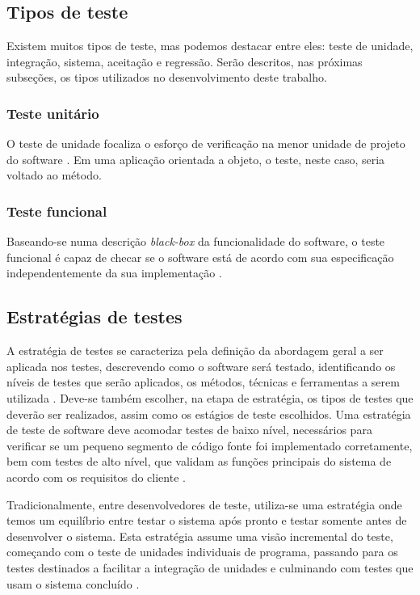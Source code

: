 \documentclass[tg]{mdtufsm}
\begin{document}
\subsection{Tipos de teste}
Existem muitos tipos de teste, mas podemos destacar entre eles: teste de unidade, integração, sistema, aceitação e regressão. Serão descritos, nas próximas subseções, os tipos utilizados no desenvolvimento deste trabalho.

\subsubsection{Teste unitário}
O teste de unidade focaliza o esforço de verificação na menor unidade de projeto do software \cite{pressman2011engenharia}. Em uma aplicação orientada a objeto, o teste, neste caso, seria voltado ao método.

\subsubsection{Teste funcional}
Baseando-se numa descrição \emph{black-box} da funcionalidade do software, o teste funcional é capaz de checar se o software está de acordo com sua especificação independentemente da sua implementação \cite{fantinato2005autotest}.
 
\subsection{Estratégias de testes}
A estratégia de testes se caracteriza pela definição da abordagem geral a ser aplicada nos testes, descrevendo como o software será testado, identificando os níveis de testes que serão aplicados, os métodos,
técnicas e ferramentas a serem utilizada \cite{rios2006teste}. Deve-se também escolher, na etapa de estratégia, os tipos de testes que deverão ser realizados, assim como os estágios de teste escolhidos. Uma estratégia de teste de software deve acomodar testes de baixo nível, necessários para verificar se um pequeno segmento de código fonte foi implementado corretamente, bem com testes de alto nível, que validam as funções principais do sistema de acordo com os requisitos do cliente \cite{pressman2011engenharia}.

Tradicionalmente, entre desenvolvedores de teste, utiliza-se uma estratégia onde temos um equilíbrio entre testar o sistema após pronto e testar somente antes de desenvolver o sistema. Esta estratégia assume uma visão incremental do teste, começando com o teste de unidades individuais de programa, passando para os testes destinados a facilitar a integração de unidades e culminando com testes que usam o sistema concluído \cite{pressman2011engenharia}.
\end{document}
